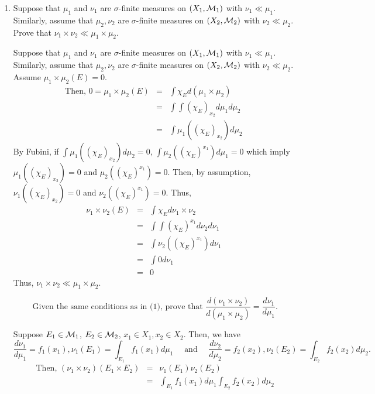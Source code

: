 \begin{enumerate}
\item Suppose that $\mu_1$ and $\nu_1$ are $\sigma$-finite measures on $(X_1, {\mathcal M}_1)$ with $\nu_1 \ll \mu_1$. Similarly, assume that $\mu_2, \nu_2$ are $\sigma$-finite measures on $(X_2, {\mathcal M}_2)$ with $\nu_2 \ll \mu_2$. Prove that $\nu_1 \times \nu_2 \ll \mu_1 \times \mu_2$.
\begin{pf}
Suppose that $\mu_1$ and $\nu_1$ are $\sigma$-finite measures on $(X_1, {\mathcal M}_1)$ with $\nu_1 \ll \mu_1$. Similarly, assume that $\mu_2, \nu_2$ are $\sigma$-finite measures on $(X_2, {\mathcal M}_2)$ with $\nu_2 \ll \mu_2$. Assume $\mu_1 \times \mu_2 (E) = 0$. 
\begin{eqnarray*}
\text{Then, } 0=\mu_1 \times \mu_2 (E) & = & \int \chi_E d (\mu_1 \times \mu_2) \\
 & = & \int \int (\chi_E)_{x_2} d \mu_1 d \mu_2 \\
 & = & \int \mu_1\left( (\chi_E)_{x_2} \right) d \mu_2
\end{eqnarray*}
By Fubini, if $\int \mu_1 \left( (\chi_E)_{x_2} \right) d \mu_2=0$, $\int \mu_2\left( (\chi_E)^{x_1} \right) d \mu_1=0$ which imply $\mu_1\left( (\chi_E)_{x_2} \right)=0$ and $\mu_2\left( (\chi_E)^{x_1} \right)=0$. Then, by assumption, $\nu_1\left( (\chi_E)_{x_2} \right)=0$ and $\nu_2\left( (\chi_E)^{x_1} \right)=0$. Thus,
\begin{eqnarray*}
\nu_1 \times \nu_2 (E) &=& \int \chi_E d \nu_1 \times \nu_2\\
&=& \int \int (\chi_E)^{x_1} d \nu_2 d \nu_1 \\
&=& \int \nu_2\left( (\chi_E)^{x_1} \right)  d \nu_1 	\\
&=& \int 0  d \nu_1 \\
& = & 0
\end{eqnarray*}
Thus, $\nu_1 \times \nu_2 \ll \mu_1 \times \mu_2$. 
\end{pf}
 \[
\text{ Given the same conditions as in (1), prove that }\frac{d(\nu_1 \times \nu_2)}{d(\mu_1 \times \mu_2)}= \frac{d \nu_1}{d \mu_1}.  
\] 
\begin{pf}
	Suppose $E_1 \in {\mathcal M}_1$, $E_2 \in {\mathcal M}_2$, $x_1 \in X_1, x_2 \in X_2$. Then, we have
	\[
	\frac{d \nu_1}{d \mu_1} = f_1(x_1), \nu_1(E_1)= \int_{E_1} f_1 (x_1) d \mu_1 \quad \text{ and } \quad  \frac{d \nu_2}{d \mu_2} = f_2(x_2), \nu_2(E_2)= \int_{E_2} f_2 (x_2) d \mu_2.
	\]
\begin{eqnarray*}
	\text{ Then, } (\nu_1 \times \nu_2)(E_1 \times E_2) &=& \nu_1(E_1) \nu_2(E_2)\\
	& = & \int_{E_1} f_1 (x_1) d \mu_1 \int_{E_2} f_2 (x_2) d \mu_2 \\

\end{eqnarray*}
\end{pf}
\end{enumerate}
